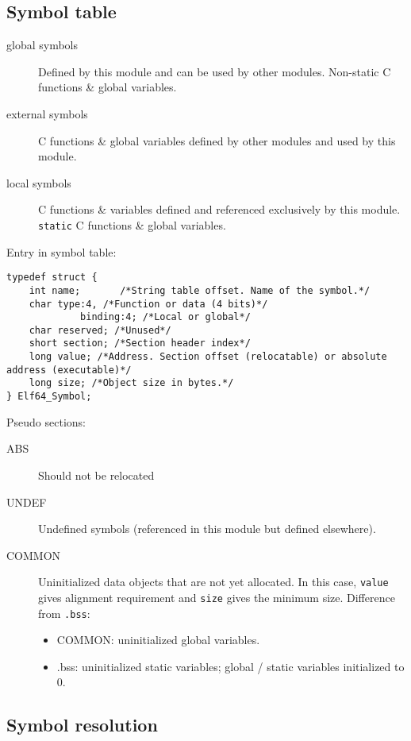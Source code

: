 \subsection{Symbol table}
\begin{description}
\item[global symbols]Defined by this module and can be used by other modules. Non-static C functions \& global variables.
\item[external symbols]C functions \& global variables defined by other modules and used by this module.
\item[local symbols]C functions \& variables defined and referenced exclusively by this module. \texttt{static} C functions \& global variables.
\end{description}
Entry in symbol table:
\begin{lstlisting}
typedef struct {
	int name;		/*String table offset. Name of the symbol.*/
	char type:4, /*Function or data (4 bits)*/
			 binding:4; /*Local or global*/
	char reserved; /*Unused*/
	short section; /*Section header index*/
	long value; /*Address. Section offset (relocatable) or absolute address (executable)*/
	long size; /*Object size in bytes.*/
} Elf64_Symbol;
\end{lstlisting}

Pseudo sections:
\begin{description}
\item[ABS]Should not be relocated
\item[UNDEF]Undefined symbols (referenced in this module but defined elsewhere).
\item[COMMON]Uninitialized data objects that are not yet allocated. In this case, \texttt{value} gives alignment requirement and \texttt{size} gives the minimum size. Difference from \texttt{.bss}:
\begin{itemize}
	\item COMMON: uninitialized global variables.
	\item .bss: uninitialized static variables; global / static variables initialized to 0.
\end{itemize} 
\end{description}
\subsection{Symbol resolution}
